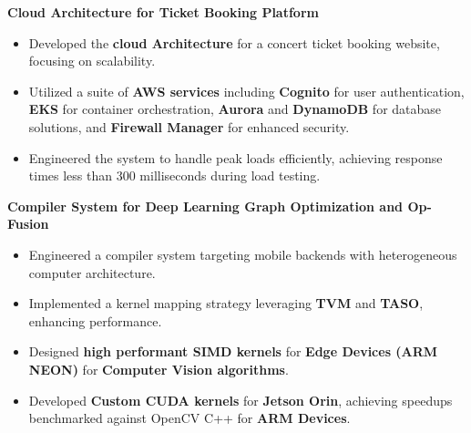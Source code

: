 \documentclass[10pt,a4]{article}
\begin{document}
{\begin{flushleft}
\begin{itemize}
        \end{itemize}
    \vspace{0.5mm}
    \item \textbf{\large Cloud Architecture for Ticket Booking Platform}
        \vspace{0.5mm}
        \begin{itemize}
            \item Developed the \textbf{cloud Architecture} for a concert ticket booking website, focusing on scalability.
            \item Utilized a suite of \textbf{AWS services} including \textbf{Cognito} for user authentication, \textbf{EKS} for container orchestration, \textbf{Aurora} and \textbf{DynamoDB} for database solutions, and \textbf{Firewall Manager} for enhanced security.
            \item Engineered the system to handle peak loads efficiently, achieving response times less than 300 milliseconds during load testing.
        \end{itemize}

    \vspace{0.5mm}
    \item \textbf{\large Compiler System for Deep Learning Graph Optimization and Op-Fusion}
        \vspace{0.5mm}
        \begin{itemize}
            \item Engineered a compiler system targeting mobile backends with heterogeneous computer architecture.
            \item Implemented a kernel mapping strategy leveraging \textbf{TVM} and \textbf{TASO}, enhancing performance.
            \item Designed \textbf{high performant SIMD kernels} for \textbf{Edge Devices (ARM NEON)} for \textbf{Computer Vision algorithms}.
            \item Developed \textbf{Custom CUDA kernels} for \textbf{Jetson Orin}, achieving speedups benchmarked against OpenCV C++ for \textbf{ARM Devices}.
        \end{itemize}

\end{flushleft}

}
	
\end{document}
